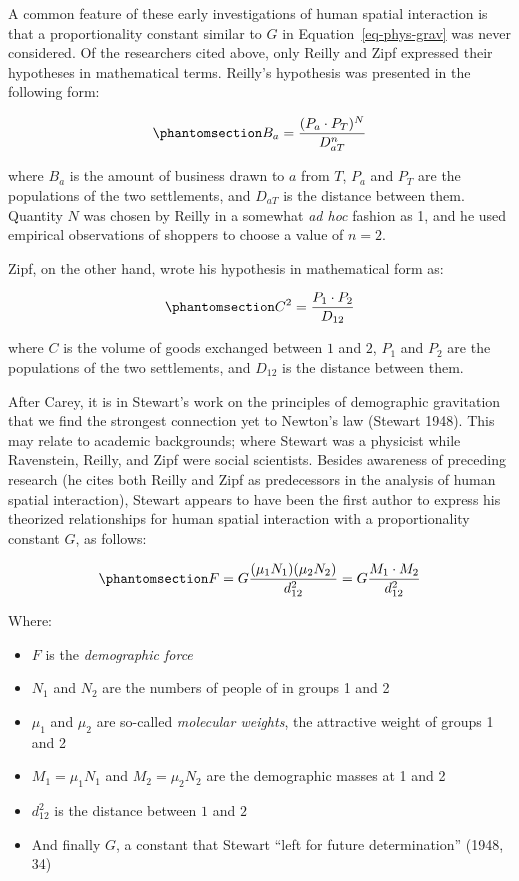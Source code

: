\documentclass[
]{article}
\providecommand{\tightlist}{%
  \setlength{\itemsep}{0pt}\setlength{\parskip}{0pt}}\usepackage{longtable,booktabs,array}
\begin{document}
A common feature of these early investigations of human spatial
interaction is that a proportionality constant similar to \(G\) in
Equation~\ref{eq-phys-grav} was never considered. Of the researchers
cited above, only Reilly and Zipf expressed their hypotheses in
mathematical terms. Reilly's hypothesis was presented in the following
form:

\begin{equation}\phantomsection\label{eq-reilly}{
B_a = \frac{(P_a\cdot P_T)^N}{D_{aT}^n}
}\end{equation}

\noindent where \(B_a\) is the amount of business drawn to \(a\) from
\(T\), \(P_a\) and \(P_T\) are the populations of the two settlements,
and \(D_{aT}\) is the distance between them. Quantity \(N\) was chosen
by Reilly in a somewhat \emph{ad hoc} fashion as 1, and he used
empirical observations of shoppers to choose a value of \(n = 2\).

Zipf, on the other hand, wrote his hypothesis in mathematical form as:

\begin{equation}\phantomsection\label{eq-zipf}{
C^2 = \frac{P_1\cdot P_2}{D_{12}}
}\end{equation}

\noindent where \(C\) is the volume of goods exchanged between \(1\) and
\(2\), \(P_1\) and \(P_2\) are the populations of the two settlements,
and \(D_{12}\) is the distance between them.

After Carey, it is in Stewart's work on the principles of demographic
gravitation that we find the strongest connection yet to Newton's law
(Stewart 1948). This may relate to academic backgrounds; where Stewart
was a physicist while Ravenstein, Reilly, and Zipf were social
scientists. Besides awareness of preceding research (he cites both
Reilly and Zipf as predecessors in the analysis of human spatial
interaction), Stewart appears to have been the first author to express
his theorized relationships for human spatial interaction with a
proportionality constant \(G\), as follows:

\begin{equation}\phantomsection\label{eq-stewart-force}{
F = G\frac{(\mu_1N_1)(\mu_2N_2)}{d_{12}^2} = G\frac{M_1\cdot M_2}{d_{12}^2} 
}\end{equation}

\noindent Where:

\begin{itemize}
\tightlist
\item
  \(F\) is the \emph{demographic force}
\item
  \(N_1\) and \(N_2\) are the numbers of people of in groups 1 and 2
\item
  \(\mu_1\) and \(\mu_2\) are so-called \emph{molecular weights}, the
  attractive weight of groups 1 and 2
\item
  \(M_1 = \mu_1N_1\) and \(M_2 = \mu_2N_2\) are the demographic masses
  at 1 and 2
\item
  \(d_{12}^2\) is the distance between \(1\) and \(2\)
\item
  And finally \(G\), a constant that Stewart ``left for future
  determination'' (1948, 34)
\end{itemize}
\end{document}
